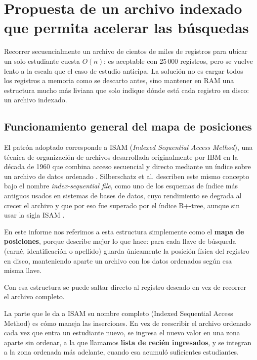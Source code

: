 \section{Propuesta de un archivo indexado que permita acelerar las búsquedas}
\label{sec:archivo-indexado}

Recorrer secuencialmente un archivo de cientos de miles de registros para ubicar un solo estudiante cuesta $O(n)$: 
es aceptable con 25\,000 registros, pero se vuelve lento a la escala que el caso de estudio anticipa. 
\newline
La solución no es cargar todos los registros a memoria como se descarto antes, sino mantener en RAM una estructura 
mucho más liviana que solo indique dónde está cada registro en disco: un archivo indexado.

\subsection{Funcionamiento general del mapa de posiciones}

El patrón adoptado corresponde a ISAM (\emph{Indexed Sequential Access Method}), una técnica de organización de archivos
desarrollada originalmente por IBM en la década de 1960 que combina acceso secuencial y directo mediante un índice
sobre un archivo de datos ordenado \autocite{geeksforgeeks2025isam}.
Silberschatz et al. describen este mismo concepto bajo el nombre \emph{index-sequential file}, como uno de los esquemas de índice más antiguos usados en sistemas de bases de datos, cuyo rendimiento se degrada al crecer el archivo y que por eso fue superado por el índice B+-tree, aunque sin usar la sigla ISAM
\autocite{silberschatz2019database}.

En este informe nos referimos a esta estructura simplemente como el \textbf{mapa de posiciones}, porque describe mejor lo que hace: 
para cada llave de búsqueda (carné, identificación o apellido) guarda únicamente la posición física del registro en disco, 
manteniendo aparte un archivo con los datos ordenados según esa misma llave.

Con esa estructura se puede saltar directo al registro deseado en vez de recorrer el archivo completo.


La parte que le da a ISAM su nombre completo (Indexed Sequential Access Method) es cómo maneja las inserciones.
En vez de reescribir el archivo ordenado cada vez que entra un estudiante nuevo, se ingresa el nuevo valor en una zona aparte
sin ordenar, a la que llamamos \textbf{lista de recién ingresados}, y se integran a la zona ordenada más adelante, cuando esa acumuló suficientes estudiantes.

